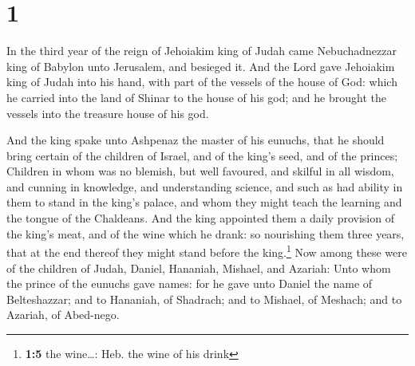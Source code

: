 \hypertarget{section}{%
\section{1}\label{section}}

 In the third year of the reign of Jehoiakim king of Judah
came Nebuchadnezzar king of Babylon unto Jerusalem, and besieged it.
 And the Lord gave Jehoiakim king of Judah into his hand,
with part of the vessels of the house of God: which he carried into the
land of Shinar to the house of his god; and he brought the vessels into
the treasure house of his god.

 And the king spake unto Ashpenaz the master of his
eunuchs, that he should bring certain of the children of Israel, and of
the king's seed, and of the princes;  Children in whom was
no blemish, but well favoured, and skilful in all wisdom, and cunning in
knowledge, and understanding science, and such as had ability in them to
stand in the king's palace, and whom they might teach the learning and
the tongue of the Chaldeans.  And the king appointed them
a daily provision of the king's meat, and of the wine which he drank: so
nourishing them three years, that at the end thereof they might stand
before the king.\footnote{\textbf{1:5} the wine\ldots: Heb. the wine of
  his drink}  Now among these were of the children of
Judah, Daniel, Hananiah, Mishael, and Azariah:  Unto whom
the prince of the eunuchs gave names: for he gave unto Daniel the name
of Belteshazzar; and to Hananiah, of Shadrach; and to Mishael, of
Meshach; and to Azariah, of Abed-nego.

